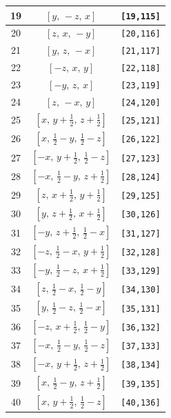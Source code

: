\documentclass[fleqn,8pt]{jsarticle}
\begin{document}
\begin{longtable}{ccc}
19 & $\left[ y,\, - z,\, x \right]$ & {\tt [19,115]} \\ \hline
20 & $\left[ z,\, x,\, - y \right]$ & {\tt [20,116]} \\ \hline
21 & $\left[ y,\, z,\, - x \right]$ & {\tt [21,117]} \\ \hline
22 & $\left[ - z,\, x,\, y \right]$ & {\tt [22,118]} \\ \hline
23 & $\left[ - y,\, z,\, x \right]$ & {\tt [23,119]} \\ \hline
24 & $\left[ z,\, - x,\, y \right]$ & {\tt [24,120]} \\ \hline
25 & $\left[ x,\, y + \frac{1}{2},\, z + \frac{1}{2} \right]$ & {\tt [25,121]} \\ \hline
26 & $\left[ x,\, \frac{1}{2} - y,\, \frac{1}{2} - z \right]$ & {\tt [26,122]} \\ \hline
27 & $\left[ - x,\, y + \frac{1}{2},\, \frac{1}{2} - z \right]$ & {\tt [27,123]} \\ \hline
28 & $\left[ - x,\, \frac{1}{2} - y,\, z + \frac{1}{2} \right]$ & {\tt [28,124]} \\ \hline
29 & $\left[ z,\, x + \frac{1}{2},\, y + \frac{1}{2} \right]$ & {\tt [29,125]} \\ \hline
30 & $\left[ y,\, z + \frac{1}{2},\, x + \frac{1}{2} \right]$ & {\tt [30,126]} \\ \hline
31 & $\left[ - y,\, z + \frac{1}{2},\, \frac{1}{2} - x \right]$ & {\tt [31,127]} \\ \hline
32 & $\left[ - z,\, \frac{1}{2} - x,\, y + \frac{1}{2} \right]$ & {\tt [32,128]} \\ \hline
33 & $\left[ - y,\, \frac{1}{2} - z,\, x + \frac{1}{2} \right]$ & {\tt [33,129]} \\ \hline
34 & $\left[ z,\, \frac{1}{2} - x,\, \frac{1}{2} - y \right]$ & {\tt [34,130]} \\ \hline
35 & $\left[ y,\, \frac{1}{2} - z,\, \frac{1}{2} - x \right]$ & {\tt [35,131]} \\ \hline
36 & $\left[ - z,\, x + \frac{1}{2},\, \frac{1}{2} - y \right]$ & {\tt [36,132]} \\ \hline
37 & $\left[ - x,\, \frac{1}{2} - y,\, \frac{1}{2} - z \right]$ & {\tt [37,133]} \\ \hline
38 & $\left[ - x,\, y + \frac{1}{2},\, z + \frac{1}{2} \right]$ & {\tt [38,134]} \\ \hline
39 & $\left[ x,\, \frac{1}{2} - y,\, z + \frac{1}{2} \right]$ & {\tt [39,135]} \\ \hline
40 & $\left[ x,\, y + \frac{1}{2},\, \frac{1}{2} - z \right]$ & {\tt [40,136]} \\ \hline

\end{longtable}
\end{document}

